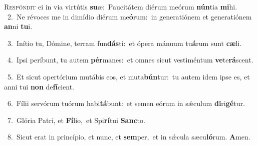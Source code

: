 \lettrine{\initial\textcolor{\initialcolor}{R}}{espóndit} ei in via virtútis \textbf{su}\-æ:~\star Paucitátem diérum meórum \textbf{nún}\-tia \textbf{mi}\-hi.\\
{\numbfont\textcolor{\numbcolor}{~2.}}~Ne révoces me in dimídio diérum me\-\textbf{ó}\-rum:~\star in generatiónem et generatiónem \textbf{an}\-ni \textbf{tu}\-i.\par
{\numbfont\textcolor{\numbcolor}{~3.}}~Inítio tu, Dómine, terram fun\-\textbf{dás}\-ti:~\star et ópera mánuum tu\-\textbf{á}\-rum sunt \textbf{cæ}\-li.\par
{\numbfont\textcolor{\numbcolor}{~4.}}~Ipsi períbunt, tu autem \textbf{pér}\-manes:~\star et omnes sicut vestiméntum \textbf{ve}\-te\-\textbf{rá}\-scent.\par
{\numbfont\textcolor{\numbcolor}{~5.}}~Et sicut opertórium mutábis eos, et muta\-\textbf{bún}\-tur:~\star tu autem idem ipse es, et anni tui \textbf{non} de\-\textbf{fí}\-cient.\par
{\numbfont\textcolor{\numbcolor}{~6.}}~Fílii servórum tuórum habi\-\textbf{tá}\-bunt:~\star et semen eórum in sǽculum \textbf{di}\-ri\-\textbf{gé}\-tur.\par
{\numbfont\textcolor{\numbcolor}{~7.}}~Glória Patri, et \textbf{Fí}\-lio,~\star et Spi\-\textbf{rí}\-tui \textbf{Sanc}\-to.\par
{\numbfont\textcolor{\numbcolor}{~8.}}~Sicut erat in princípio, et nunc, et \textbf{sem}\-per,~\star et in sǽcula sæcu\-\textbf{ló}\-rum. \textbf{A}\-men.\par

